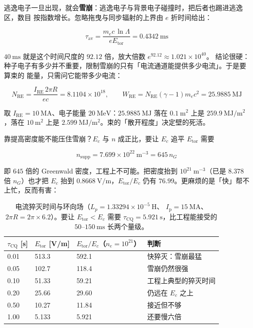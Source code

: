逃逸电子一旦出现，就会\textbf{雪崩}：逃逸电子与背景电子碰撞时，把后者也踢进逃逸区，数目
按指数增长。忽略拖曳与同步辐射的上界由 $e$ 折时间给出：

\begin{equation}
\tau_{\mathrm{av}} = \frac{m_e c\,\ln\Lambda}{e E_{\mathrm{tor}}}
= 0.4342\ \mathrm{ms}
\label{eq:app-v-avalanche}
\end{equation}

$40\ \mathrm{ms}$ 就是这个时间尺度的 $92.12$ 倍，放大倍数 $e^{92.12}\approx1.021\times10^{40}$。
结论很硬：种子电子有多少并不重要，限制雪崩的只有「电流通道能提供多少电流」。于是要算束的
能量，只需问它能带多少电流：

\begin{equation}
N_{\mathrm{RE}} = \frac{I_{\mathrm{RE}}\,2\pi R}{e c} = 8.1104\times10^{18},
\qquad
W_{\mathrm{RE}} = N_{\mathrm{RE}}(\gamma-1)m_e c^2 = 25.9885\ \mathrm{MJ}
\label{eq:app-v-wre}
\end{equation}

取 $I_{\mathrm{RE}}=10\ \mathrm{MA}$、电子能量 $20\ \mathrm{MeV}$：$25.9885\ \mathrm{MJ}$
落在 $0.1\ \mathrm{m^2}$ 上是 $259.9\ \mathrm{MJ/m^2}$，落在 $10\ \mathrm{m^2}$ 上是
$2.599\ \mathrm{MJ/m^2}$。束的「散开程度」决定壁的死活。

靠提高密度能不能压住雪崩？$E_c$ 与 $n$ 成正比，要让
$E_c$ 追平 $E_{\mathrm{tor}}$ 需要

\begin{equation}
n_{\mathrm{supp}} = 7.699\times10^{22}\ \mathrm{m^{-3}} = 645\,n_G
\label{eq:app-v-nsupp}
\end{equation}

即 $645$ 倍的 Greenwald 密度，工程上不可能。把密度抬到 $10^{21}\ \mathrm{m^{-3}}$（已是
$8.378$ 倍 $n_G$）也才把 $E_c$ 抬到 $0.8668\ \mathrm{V/m}$，$E_{\mathrm{tor}}/E_c$ 仍有
$76.99$。更麻烦的是「快」帮不上忙，反而有害：

\begin{table}[htbp]
\centering
\small
\caption{电流猝灭时间与环向场（$L_p=1.33294\times10^{-5}\ \mathrm{H}$、
$I_{\mathrm p}=15\ \mathrm{MA}$、$2\pi R=2\pi\times6.2$）。要让
$E_{\mathrm{tor}}<E_c$ 需要 $\tau_{\mathrm{CQ}}=5.921\ \mathrm{s}$，比工程能接受的
$50$--$150\ \mathrm{ms}$ 长两个量级。}
\label{tab:app-v-cq}
\begin{tabular}{@{}p{2.6cm}p{2.6cm}p{3.0cm}p{3.4cm}@{}}
\toprule
$\tau_{\mathrm{CQ}}$ [s] & $E_{\mathrm{tor}}$ [V/m] & $E_{\mathrm{tor}}/E_c$（$n_e=10^{21}$） & 判断 \\
\midrule
0.01 & 513.3 & 592.1 & 快猝灭：雪崩最猛 \\
0.05 & 102.7 & 118.4 & 雪崩仍然很强 \\
0.10 & 51.33 & 59.21 & 工程上典型的猝灭时间 \\
0.20 & 25.66 & 29.60 & 仍远在 $E_c$ 之上 \\
0.50 & 10.27 & 11.84 & 接近但不够 \\
1.00 & 5.133 & 5.921 & 还要慢六倍 \\
\bottomrule
\end{tabular}

\end{table}

